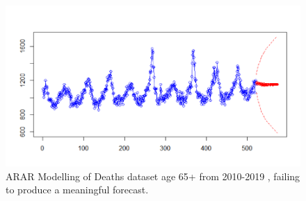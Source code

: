 \documentclass[a4paper, oneside]{discothesis}
\begin{document}


\begin{figure}[ht]
\centering
\includegraphics[width=.8\textwidth]{figures/ARAR_test.png}
\caption{ARAR Modelling of Deaths dataset age 65+ from 2010-2019 \cite{deaths_2010-2019}, failing to produce a meaningful forecast.}
\end{figure}

\end{document}
